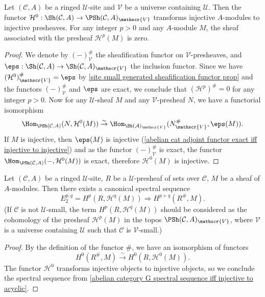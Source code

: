 \begin{proposition}\label{ringed site change universe cohomology prop}
Let $(\mathcal{C},A)$ be a ringed $\mathscr{U}$-site and $\mathscr{V}$ be a universe containing $\mathscr{U}$. Then the functor $\mathcal{H}^0:\Sh(\mathcal{C},A)\to \PSh(\mathcal{C},A)_\mathscr{V}$ transforms injective $A$-modules to injective presheaves. For any integer $p>0$ and any $A$-module $M$, the sheaf associated with the presheaf $\mathcal{H}^p(M)$ is zero.
\end{proposition}
\begin{proof}
We denote by $(-)^\#_\mathscr{V}$ the sheafification functor on $\mathscr{V}$-presheaves, and $\eps:\Sh(\mathcal{C},A)\to \Sh(\mathcal{C},A)_\mathscr{V}$ the inclusion functor. Since we have $(\mathcal{H}^0)^\#_\mathscr{V}=\eps$ by \cref{site small generated sheafification functor prop} and the functors $(-)^\#_\mathscr{V}$ and $\eps$ are exact, we conclude that $(\mathcal{H}^p)^\#=0$ for any integer $p>0$. Now for any $\mathscr{U}$-sheaf $M$ and any $\mathscr{V}$-presheaf $N$, we have a functorial isomorphism
\[\Hom_{\PSh(\mathcal{C},A)}(N,\mathcal{H}^0(M)) \stackrel{\sim}{\to } \Hom_{\Sh(\mathcal{A})_\mathscr{V}}(N^\#_\mathscr{V},\eps(M)).\]
If $M$ is injective, then $\eps(M)$ is injective (\cref{abelian cat adjoint functor exact iff injective to injective}) and as the functor $(-)^\#_\mathscr{V}$ is exact, the functor $\Hom_{\PSh(\mathcal{C},A)}(-,\mathcal{H}^0(M))$ is exact, therefore $\mathcal{H}^0(M)$ is injective.
\end{proof}

\begin{theorem}\label{ringed site Leray spectral sequence for presheaf functor}
Let $(\mathcal{C},A)$ be a ringed $\mathscr{U}$-site, $R$ be a $\mathscr{U}$-presheaf of sets over $\mathcal{C}$, $M$ be a sheaf of $A$-modules. Then there exists a canonical spectral sequence
\begin{equation}\label{ringed site Leray spectral sequence for presheaf functor-1}
E_2^{p,q}=H^p(R,\mathcal{H}^q(M))\Rightarrow H^{p+q}(R^\#,M).
\end{equation}
(If $\mathcal{C}$ is not $\mathscr{U}$-small, the term $H^p(R,\mathcal{H}^q(M))$ should be considered as the cohomology of the presheaf $\mathcal{H}^p(M)$ in the topos $\PSh(\mathcal{C},A)_\mathscr{V}$, where $\mathscr{V}$ is a universe containing $\mathscr{U}$ such that $\mathcal{C}$ is $\mathscr{V}$-small.)
\end{theorem}
\begin{proof}
By the definition of the functor $\#$, we have an isomorphism of functors
\[H^0(R^\#,M) \stackrel{\sim}{\to } H^0(R,\mathcal{H}^0(M)).\]
The functor $\mathcal{H}^0$ transforms injective objects to injective objects, so we conclude the spectral sequence from \cref{abelian category G spectral sequence iff injective to acyclic}.
\end{proof}

